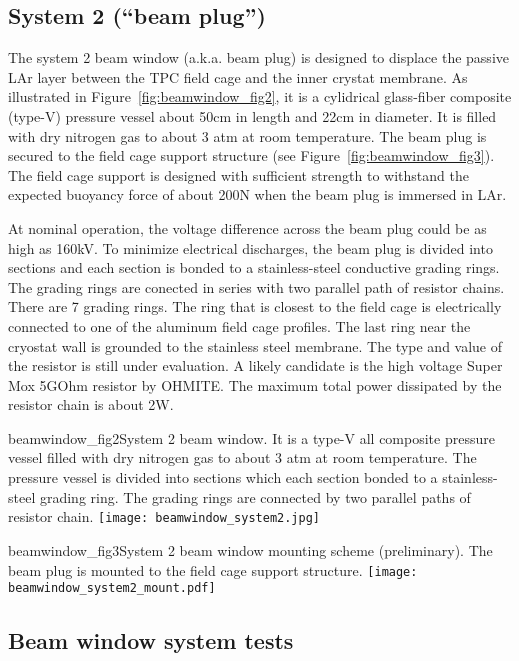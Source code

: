 \subsection{System 2 (``beam plug'')}
The system 2 beam window (a.k.a. beam plug) is designed to displace the passive LAr layer between the TPC field cage and the inner crystat membrane. As illustrated in Figure~\ref{fig:beamwindow_fig2}, it is a cylidrical glass-fiber composite (type-V) pressure vessel about 50cm in length and  22cm in diameter. It is filled with dry nitrogen gas to about 3 atm at room temperature. The beam plug is secured to the field cage support structure (see Figure~\ref{fig:beamwindow_fig3}). The field cage support is designed with sufficient strength to withstand the expected buoyancy force of about 200N when the beam plug is immersed in LAr. 

At nominal operation, the voltage difference across the beam plug could be as high as 160kV. To minimize electrical discharges, the beam plug is divided into sections and each section is bonded to a stainless-steel conductive grading rings. The grading rings are conected in series with two parallel path of resistor chains. There are 7 grading rings. The ring that is closest to the field cage is electrically connected to one of the aluminum field cage profiles. The last ring near the cryostat wall is grounded to the stainless steel membrane. The type and value of the resistor is still under evaluation. A likely candidate is the high voltage Super Mox 5GOhm resistor by OHMITE. The maximum total power dissipated by the resistor chain is about 2W.

\begin{cdrfigure}{beamwindow_fig2}{System 2 beam window. It is a type-V all composite pressure vessel filled with dry nitrogen gas to about 3 atm at room temperature. The pressure vessel is divided into sections which each section bonded to a stainless-steel grading ring. The grading rings are connected by two parallel paths of resistor chain.}
  \texttt{[image: beamwindow\_system2.jpg]}
\end{cdrfigure}

\begin{cdrfigure}{beamwindow_fig3}{System 2 beam window mounting scheme (preliminary). The beam plug is mounted to the field cage support structure.}
  \texttt{[image: beamwindow\_system2\_mount.pdf]}
\end{cdrfigure}

\subsection{Beam window system tests}




